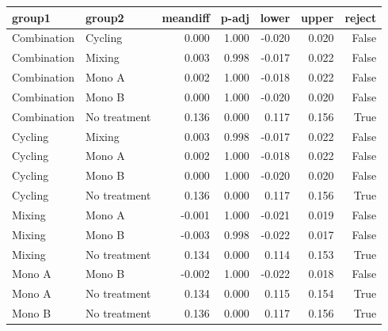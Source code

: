 \begin{tabular}{llrrrrr}
\toprule
group1 & group2 & meandiff & p-adj & lower & upper & reject \\
\midrule
Combination & Cycling & 0.000 & 1.000 & -0.020 & 0.020 & False \\
Combination & Mixing & 0.003 & 0.998 & -0.017 & 0.022 & False \\
Combination & Mono A & 0.002 & 1.000 & -0.018 & 0.022 & False \\
Combination & Mono B & 0.000 & 1.000 & -0.020 & 0.020 & False \\
Combination & No treatment & 0.136 & 0.000 & 0.117 & 0.156 & True \\
Cycling & Mixing & 0.003 & 0.998 & -0.017 & 0.022 & False \\
Cycling & Mono A & 0.002 & 1.000 & -0.018 & 0.022 & False \\
Cycling & Mono B & 0.000 & 1.000 & -0.020 & 0.020 & False \\
Cycling & No treatment & 0.136 & 0.000 & 0.117 & 0.156 & True \\
Mixing & Mono A & -0.001 & 1.000 & -0.021 & 0.019 & False \\
Mixing & Mono B & -0.003 & 0.998 & -0.022 & 0.017 & False \\
Mixing & No treatment & 0.134 & 0.000 & 0.114 & 0.153 & True \\
Mono A & Mono B & -0.002 & 1.000 & -0.022 & 0.018 & False \\
Mono A & No treatment & 0.134 & 0.000 & 0.115 & 0.154 & True \\
Mono B & No treatment & 0.136 & 0.000 & 0.117 & 0.156 & True \\
\bottomrule
\end{tabular}
